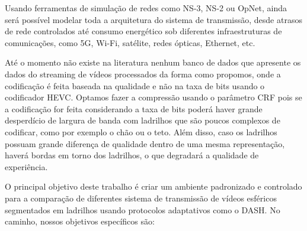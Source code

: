 Usando ferramentas de simulação de redes como NS-3, NS-2 ou OpNet, ainda será possível modelar toda a arquitetura do sistema de transmissão, desde atrasos de rede controlados até consumo energético sob diferentes infraestruturas de comunicações, como 5G, Wi-Fi, satélite, redes ópticas, Ethernet, etc.



Até o momento não existe na literatura nenhum banco de dados que apresente os dados do streaming de vídeos processados da forma como propomos, onde a codificação é feita baseada na qualidade e não na taxa de bits usando o codificador HEVC. Optamos fazer a compressão usando o parâmetro CRF pois se a codificação for feita considerando a taxa de bits poderá haver grande desperdício de largura de banda com ladrilhos que são poucos complexos de codificar, como por exemplo o chão ou o teto. Além disso, caso os ladrilhos possuam grande diferença de qualidade dentro de uma mesma representação, haverá bordas em torno dos ladrilhos, o que degradará a qualidade de experiência.

O principal objetivo deste trabalho é criar um ambiente padronizado e controlado para a comparação de diferentes sistema de transmissão de vídeos esféricos segmentados em ladrilhos usando protocolos adaptativos como o DASH. No caminho, nossos objetivos específicos são:

